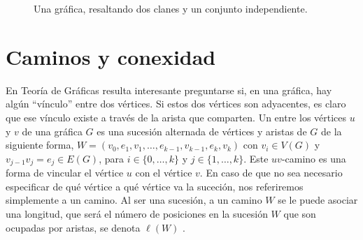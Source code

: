 \begin{figure}[ht!]
    \centering
    \caption{Una gr\'afica, resaltando dos clanes y un conjunto independiente.}
    \label{fig:ClanInd}
\end{figure}


\section{Caminos y conexidad}
\label{sec:CamConex}


    En Teor\'ia de Gr\'aficas resulta interesante preguntarse si, en una
    gr\'afica, hay alg\'un ``v\'inculo'' entre dos v\'ertices. Si estos dos
    v\'ertices son adyacentes, es claro que ese v\'inculo existe a trav\'es de
    la arista que comparten. Un  entre los v\'ertices $u$ y
    $v$ de una gr\'afica $G$ es una sucesi\'on alternada de v\'ertices y aristas
    de $G$ de la siguiente forma, $W=(v_0, e_1,v_1, \dots, e_{k-1},v_{k-1},
    e_k,v_k)$ con $v_i \in V(G)$ y $v_{j-1}v_j = e_j \in E(G)$, para $i \in \{0,
    \dots, k\}$ y $j \in \{ 1, \dots, k\}$. Este $uv$-camino es una forma de
    vincular el v\'ertice $u$ con el v\'ertice $v$. En caso de que no sea
    necesario especificar de qu\'e v\'ertice a qu\'e v\'ertice va la suceci\'on,
    nos referiremos simplemente a un camino. Al ser una sucesi\'on, a un camino
    $W$ se le puede asociar una longitud, que ser\'a el n\'umero de posiciones
    en la sucesi\'on $W$ que son ocupadas por aristas, se denota $\ell(W)$ . 
    
